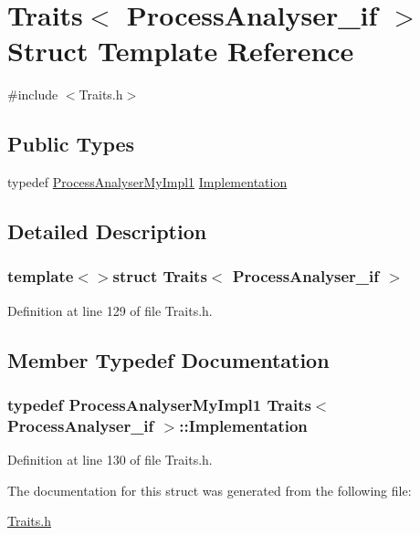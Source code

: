 \hypertarget{struct_traits_3_01_process_analyser__if_01_4}{\section{Traits$<$ Process\-Analyser\-\_\-if $>$ Struct Template Reference}
\label{struct_traits_3_01_process_analyser__if_01_4}
}


{\ttfamily \#include $<$Traits.\-h$>$}

\subsection*{Public Types}
\begin{DoxyCompactItemize}
\item 
typedef \hyperlink{class_process_analyser_my_impl1}{Process\-Analyser\-My\-Impl1} \hyperlink{struct_traits_3_01_process_analyser__if_01_4_a07937b53ae16bb3a41301a0393ac679f}{Implementation}
\end{DoxyCompactItemize}


\subsection{Detailed Description}
\subsubsection*{template$<$$>$struct Traits$<$ Process\-Analyser\-\_\-if $>$}



Definition at line 129 of file Traits.\-h.



\subsection{Member Typedef Documentation}
\hypertarget{struct_traits_3_01_process_analyser__if_01_4_a07937b53ae16bb3a41301a0393ac679f}{
\subsubsection[{Implementation}]{\setlength{\rightskip}{0pt plus 5cm}typedef {\bf Process\-Analyser\-My\-Impl1} {\bf Traits}$<$ {\bf Process\-Analyser\-\_\-if} $>$\-::{\bf Implementation}}}\label{struct_traits_3_01_process_analyser__if_01_4_a07937b53ae16bb3a41301a0393ac679f}


Definition at line 130 of file Traits.\-h.



The documentation for this struct was generated from the following file\-:\begin{DoxyCompactItemize}
\item 
\hyperlink{_traits_8h}{Traits.\-h}\end{DoxyCompactItemize}
